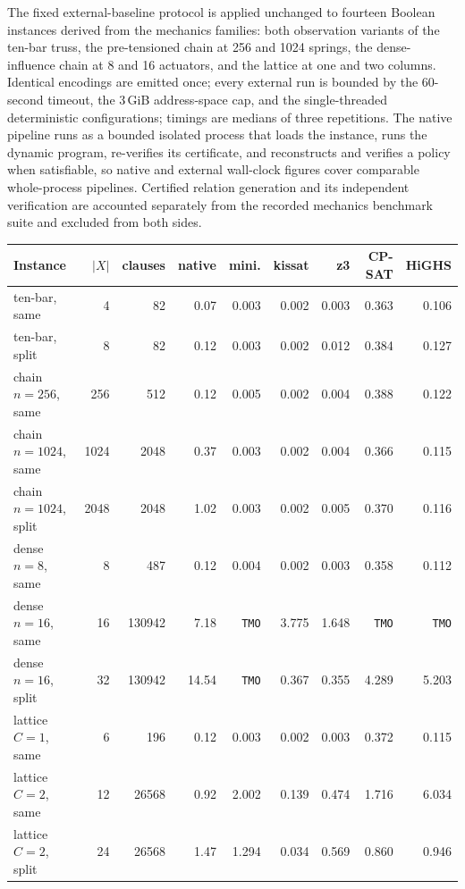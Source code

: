 \documentclass[11pt]{article}
\theoremstyle{plain}
\theoremstyle{definition}
\theoremstyle{remark}
\begin{document}
The fixed external-baseline protocol is applied unchanged to fourteen
Boolean instances derived from the mechanics families: both observation
variants of the ten-bar truss, the pre-tensioned chain at 256 and 1024
springs, the dense-influence chain at 8 and 16 actuators, and the lattice at
one and two columns.  Identical encodings are emitted once; every external
run is bounded by the 60-second timeout, the 3\,GiB address-space cap, and
the single-threaded deterministic configurations; timings are medians of
three repetitions.  The native pipeline runs as a bounded isolated process
that loads the instance, runs the dynamic program, re-verifies its
certificate, and reconstructs and verifies a policy when satisfiable, so
native and external wall-clock figures cover comparable whole-process
pipelines.  Certified relation generation and its independent verification
are accounted separately from the recorded mechanics benchmark suite and
excluded from both sides.

\begin{center}
\footnotesize
\begin{tabular}{@{}lrrrrrrrr@{}}
\toprule
Instance & \(\lvert X\rvert\) & clauses & native & mini. & kissat & z3 & CP-SAT & HiGHS\\
\midrule
ten-bar, same & 4 & 82 & 0.07 & 0.003 & 0.002 & 0.003 & 0.363 & 0.106\\
ten-bar, split & 8 & 82 & 0.12 & 0.003 & 0.002 & 0.012 & 0.384 & 0.127\\
chain \(n{=}256\), same & 256 & 512 & 0.12 & 0.005 & 0.002 & 0.004 & 0.388 & 0.122\\
chain \(n{=}1024\), same & 1024 & 2048 & 0.37 & 0.003 & 0.002 & 0.004 & 0.366 & 0.115\\
chain \(n{=}1024\), split & 2048 & 2048 & 1.02 & 0.003 & 0.002 & 0.005 & 0.370 & 0.116\\
dense \(n{=}8\), same & 8 & 487 & 0.12 & 0.004 & 0.002 & 0.003 & 0.358 & 0.112\\
dense \(n{=}16\), same & 16 & 130942 & 7.18 & \texttt{TMO} & 3.775 & 1.648 & \texttt{TMO} & \texttt{TMO}\\
dense \(n{=}16\), split & 32 & 130942 & 14.54 & \texttt{TMO} & 0.367 & 0.355 & 4.289 & 5.203\\
lattice \(C{=}1\), same & 6 & 196 & 0.12 & 0.003 & 0.002 & 0.003 & 0.372 & 0.115\\
lattice \(C{=}2\), same & 12 & 26568 & 0.92 & 2.002 & 0.139 & 0.474 & 1.716 & 6.034\\
lattice \(C{=}2\), split & 24 & 26568 & 1.47 & 1.294 & 0.034 & 0.569 & 0.860 & 0.946\\
\bottomrule
\end{tabular}
\label{tab:mechanics-baselines}
\end{center}
\end{document}
